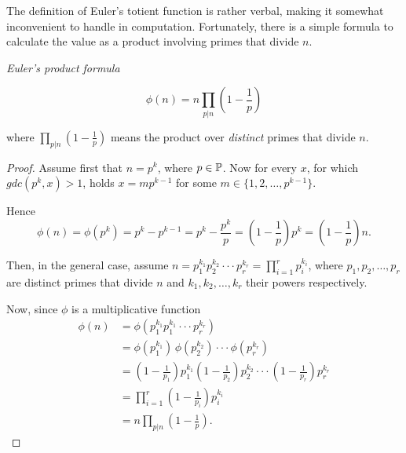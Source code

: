 \documentclass{article}
\begin{document}
The definition of Euler's totient function is rather verbal, making it somewhat inconvenient to handle in computation. Fortunately, there is a simple formula to calculate the value as a product involving primes that divide $n$.

\begin{theorem}{\emph{Euler's product formula}}
\label{thm:product}


\begin{equation*}
    \phi(n) = n \prod_{p \vert n} \left(1 - \frac{1}{p}\right)
\end{equation*}

where $\prod_{p \vert n} \left(1 - \frac{1}{p}\right)$ means the product over \emph{distinct} primes that divide $n$.

\begin{proof}

Assume first that $n = p^k$, where $p\in \mathbb{P}$. Now for every $x$, for which $gdc(p^k,x)>1$, holds $x=mp^{k-1}$ for some $m\in \{1,2,\dots,p^{k-1}\}$.

Hence
\begin{equation*}
    \phi(n)=\phi(p^k)=p^k-p^{k-1}=p^k-\frac{p^k}{p}=\left(1-\frac{1}{p}\right)p^k=\left(1-\frac{1}{p}\right)n.
\end{equation*}

Then, in the general case, assume $n=p_1^{k_1} p_2^{k_2} \cdot \cdot \cdot p_r^{k_r}=\prod_{i=1}^r p_i^{k_i}$, where $p_1,p_2,\dots,p_r$ are distinct primes that divide $n$ and $k_1,k_2,\dots,k_r$ their powers respectively. 


Now, since $\phi$ is a multiplicative function
\begin{align*}
    \phi(n) & = \phi(p_1^{k_1} p_1^{k_1} \cdot \cdot \cdot p_r^{k_r})\\
    & = \phi(p_1^{k_1})\,\phi(p_2^{k_2}) \cdot \cdot \cdot \phi(p_r^{k_r})\\
    & = \left(1-\frac{1}{p_1}\right)p_1^{k_1} \left(1-\frac{1}{p_2}\right)p_2^{k_2} \cdot \cdot \cdot \left(1-\frac{1}{p_r}\right)p_r^{k_r}\\
    & = \prod_{i=1}^r \left(1-\frac{1}{p_i}\right) p_i^{k_i}\\
    & = n \prod_{p \vert n} \left(1 - \frac{1}{p}\right).
\end{align*}

\end{proof}

\end{theorem}
\end{document}
